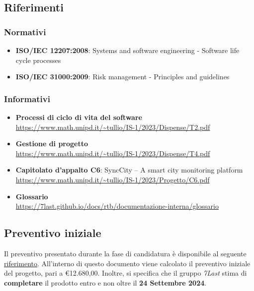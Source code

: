 \subsection{Riferimenti}
    \subsubsection{Normativi} %
        \begin{itemize}
            \item \textbf{ISO/IEC 12207:2008}: Systems and software engineering - Software life cycle processes
            \item \textbf{ISO/IEC 31000:2009}: Risk management - Principles and guidelines
        \end{itemize}
    \subsubsection{Informativi}
        \begin{itemize}
            \item \textbf{Processi di ciclo di vita del software} \\
                \url{https://www.math.unipd.it/~tullio/IS-1/2023/Dispense/T2.pdf}
            \item \textbf{Gestione di progetto} \\ 
                \url{https://www.math.unipd.it/~tullio/IS-1/2023/Dispense/T4.pdf}
            \item \textbf{Capitolato d'appalto C6}: SyncCity – A smart city monitoring platform\\
                \url{https://www.math.unipd.it/~tullio/IS-1/2023/Progetto/C6.pdf}
            \item \textbf{Glossario} \\
                \url{https://7last.github.io/docs/rtb/documentazione-interna/glossario}
            \end{itemize}

\subsection{Preventivo iniziale}
Il preventivo presentato durante la fase di candidatura è disponibile al seguente \uline{\href{https://github.com/7Last/docs/blob/main/1_candidatura/preventivo_costi_assunzione_impegni_v2.0.pdf}{riferimento}}. All'interno di questo documento viene calcolato il preventivo iniziale del progetto, pari a €12.680,00. Inoltre, si specifica che il gruppo \textit{7Last} stima di \textbf{completare} il prodotto entro e non oltre il \textbf{24 Settembre 2024}.